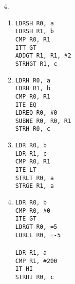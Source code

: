 \documentclass{article}
\begin{document}
\begin{enumerate}
    \item[4.]
        \begin{multicols}{2}
        \begin{enumerate}
            \item
                \texttt{LDRSH R0, a  \\
                LDRSH R1, b  \\
                CMP R0, R1  \\
                ITT  GT      \\
                ADDGT R1, R1, \#2 \\
                STRHGT R1, c  \\
                }
            \item
                \texttt{LDRH R0, a   \\
                LDRH R1, b  \\
                CMP R0, R1  \\
                ITE EQ    \\
                LDREQ R0, \#0 \\
                SUBNE R0, R0, R1  \\
                STRH R0, c  \\
                }
            \item
                \texttt{LDR R0, b   \\
                LDR R1, c   \\
                CMP R0, R1  \\
                ITE  LT     \\
                STRLT R0, a   \\
                STRGE R1, a   \\
                }
            \item
                \texttt{LDR R0, b   \\
                CMP R0, \#0     \\
                ITE  GT  \\
                LDRGT R0, =5 \\
                LDRLE R0, =-5\\
                \\
                LDR R1, a   \\
                CMP R1, \#200 \\
                IT  HI  \\
                STRHI R0, c \\
                } 
        \end{enumerate}
        \end{multicols}


\end{enumerate}
\end{document}
